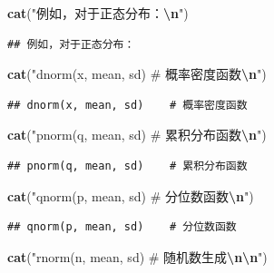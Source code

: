 \documentclass[
  twoside]{book}
\newenvironment{Shaded}{\begin{snugshade}}{\end{snugshade}}
\newcommand{\FunctionTok}[1]{\textcolor[rgb]{0.13,0.29,0.53}{\textbf{#1}}}
\newcommand{\NormalTok}[1]{#1}
\newcommand{\SpecialCharTok}[1]{\textcolor[rgb]{0.81,0.36,0.00}{\textbf{#1}}}
\newcommand{\StringTok}[1]{\textcolor[rgb]{0.31,0.60,0.02}{#1}}
\begin{document}
\begin{Shaded}
\begin{Highlighting}[]
\FunctionTok{cat}\NormalTok{(}\StringTok{"例如，对于正态分布：}\SpecialCharTok{\textbackslash{}n}\StringTok{"}\NormalTok{)}
\end{Highlighting}
\end{Shaded}

\begin{verbatim}
## 例如，对于正态分布：
\end{verbatim}

\begin{Shaded}
\begin{Highlighting}[]
\FunctionTok{cat}\NormalTok{(}\StringTok{"dnorm(x, mean, sd)    \# 概率密度函数}\SpecialCharTok{\textbackslash{}n}\StringTok{"}\NormalTok{)}
\end{Highlighting}
\end{Shaded}

\begin{verbatim}
## dnorm(x, mean, sd)    # 概率密度函数
\end{verbatim}

\begin{Shaded}
\begin{Highlighting}[]
\FunctionTok{cat}\NormalTok{(}\StringTok{"pnorm(q, mean, sd)    \# 累积分布函数}\SpecialCharTok{\textbackslash{}n}\StringTok{"}\NormalTok{)}
\end{Highlighting}
\end{Shaded}

\begin{verbatim}
## pnorm(q, mean, sd)    # 累积分布函数
\end{verbatim}

\begin{Shaded}
\begin{Highlighting}[]
\FunctionTok{cat}\NormalTok{(}\StringTok{"qnorm(p, mean, sd)    \# 分位数函数}\SpecialCharTok{\textbackslash{}n}\StringTok{"}\NormalTok{)}
\end{Highlighting}
\end{Shaded}

\begin{verbatim}
## qnorm(p, mean, sd)    # 分位数函数
\end{verbatim}

\begin{Shaded}
\begin{Highlighting}[]
\FunctionTok{cat}\NormalTok{(}\StringTok{"rnorm(n, mean, sd)    \# 随机数生成}\SpecialCharTok{\textbackslash{}n\textbackslash{}n}\StringTok{"}\NormalTok{)}
\end{Highlighting}
\end{Shaded}
\end{document}
